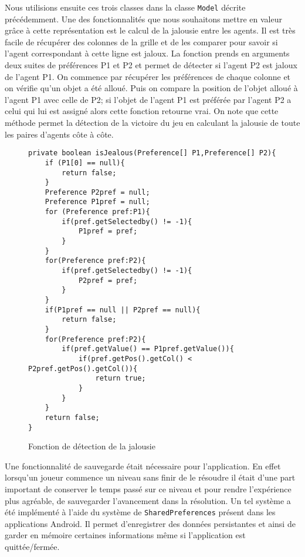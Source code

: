 \documentclass[../main.tex]{subfiles}
\begin{document}
Nous utilisions ensuite ces trois classes dans la classe \texttt{Model} décrite précédemment. Une des fonctionnalités que nous souhaitons mettre en valeur grâce à cette représentation est le calcul de la jalousie entre les agents. Il est très facile de récupérer des colonnes de la grille et de les comparer pour savoir si l'agent correspondant à cette ligne est jaloux. La fonction prends en arguments deux suites de préférences \textsf{P1} et \textsf{P2} et permet de détecter si l'agent \textsf{P2} est jaloux de l'agent \textsf{P1}. On commence par récupérer les préférences de chaque colonne et on vérifie qu'un objet a été alloué. Puis on compare la position de l'objet alloué à l'agent \textsf{P1} avec celle de \textsf{P2}; si l'objet de l'agent \textsf{P1} est préférée par l'agent \textsf{P2} a celui qui lui est assigné alors cette fonction retourne vrai. On note que cette méthode permet la détection de la victoire du jeu en calculant la jalousie de toute les paires d'agents côte à côte.

\begin{figure}[ht!]
\begin{lstlisting}
private boolean isJealous(Preference[] P1,Preference[] P2){
    if (P1[0] == null){
        return false;
    }
    Preference P2pref = null;
    Preference P1pref = null;
    for (Preference pref:P1){
        if(pref.getSelectedby() != -1){
            P1pref = pref;
        }
    }
    for(Preference pref:P2){
        if(pref.getSelectedby() != -1){
            P2pref = pref;
        }
    }
    if(P1pref == null || P2pref == null){
        return false;
    }
    for(Preference pref:P2){
        if(pref.getValue() == P1pref.getValue()){
            if(pref.getPos().getCol() < P2pref.getPos().getCol()){
                return true;
            }
        }
    }
    return false;
}
\end{lstlisting}
\caption{Fonction de détection de la jalousie}
\label{detection-jalousie}
\end{figure}

Une fonctionnalité de sauvegarde était nécessaire pour l'application. En effet lorsqu'un joueur commence un niveau sans finir de le résoudre il était d'une part important de conserver le temps passé sur ce niveau et pour rendre l'expérience plus agréable, de sauvegarder l'avancement dans la résolution. Un tel système a été implémenté à l'aide du système de \texttt{SharedPreferences} présent dans les applications Android. Il permet d'enregistrer des données persistantes et ainsi de garder en mémoire certaines informations même si l'application est quittée/fermée.
\end{document}
